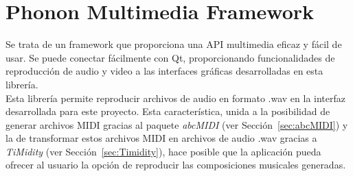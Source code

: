 \section{Phonon Multimedia Framework}
\label{sec:Phonon}

Se trata de un framework que proporciona una API multimedia eficaz y fácil de usar. Se puede conectar fácilmente con Qt, proporcionando funcionalidades de reproducción de audio y video a las interfaces gráficas desarrolladas en esta librería.\\

Esta librería permite reproducir archivos de audio en formato .wav en la interfaz desarrollada para este proyecto. Esta característica, unida a la posibilidad de generar archivos MIDI gracias al paquete \emph{abcMIDI} (ver Sección~\ref{sec:abcMIDI}) y la de transformar estos archivos MIDI en archivos de audio .wav gracias a \emph{TiMidity} (ver Sección~\ref{sec:Timidity}), hace posible que la aplicación pueda ofrecer al usuario la opción de reproducir las composiciones musicales generadas.